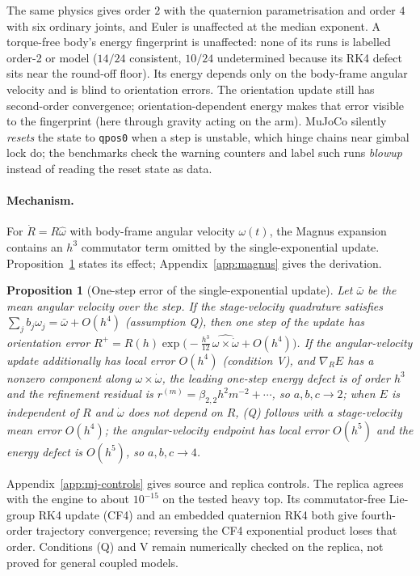 \documentclass[10pt]{article}
\newtheorem{proposition}{Proposition}
\theoremstyle{definition}
\begin{document}
The same physics gives order $2$ with the quaternion parametrisation and order
$4$ with six ordinary joints, and Euler is unaffected at the median exponent.
A torque-free body's energy fingerprint is unaffected: none of its runs is labelled order-2 or model
($14/24$ consistent, $10/24$ undetermined because its RK4 defect sits near the round-off floor). Its energy depends only on the
body-frame angular velocity and is blind to orientation errors. The orientation
update still has second-order convergence; orientation-dependent energy makes
that error visible to the fingerprint (here through gravity acting on the arm). MuJoCo
silently \emph{resets} the state to \texttt{qpos0} when a step is unstable,
which hinge chains near gimbal lock do; the benchmarks check the warning
counters and label such runs \emph{blowup} instead of reading the reset state
as data.

\paragraph{Mechanism.} For $\dot R=R\hat\omega$ with body-frame angular
velocity $\omega(t)$, the Magnus expansion contains an $h^3$ commutator term
omitted by the single-exponential update. Proposition~\ref{prop:magnus}
states its effect; Appendix~\ref{app:magnus} gives the derivation.

\begin{proposition}[One-step error of the single-exponential update]\label{prop:magnus}
Let $\bar\omega$ be the mean angular velocity over the step.
If the stage-velocity quadrature satisfies $\sum_jb_j\omega_j=\bar\omega+O(h^4)$
(assumption Q), then one step of the update has orientation error
$R^+=R(h)\exp\big(-\tfrac{h^3}{12}\,\widehat{\omega\times\dot\omega}+O(h^4)\big)$.
If the angular-velocity update additionally has local error $O(h^4)$
(condition V), and $\nabla_R E$ has a nonzero component along
$\omega\times\dot\omega$, the leading one-step energy defect is of order $h^3$ and the
refinement residual is $r^{(m)}=\beta_{2,2}h^2m^{-2}+\cdots$, so $a,b,c\to2$; when
$E$ is independent of $R$ and $\dot\omega$ does not depend on $R$, (Q) follows with a stage-velocity mean error $O(h^4)$; the angular-velocity
endpoint has local error $O(h^5)$ and the energy defect is $O(h^5)$, so $a,b,c\to4$.
\end{proposition}

Appendix~\ref{app:mj-controls} gives source and replica controls. The replica
agrees with the engine to about $10^{-15}$ on the tested heavy top. Its
commutator-free Lie-group RK4 update (CF4) and an embedded quaternion RK4 both
give fourth-order trajectory convergence; reversing the CF4 exponential
product loses that order. Conditions (Q) and V remain numerically checked on
the replica, not proved for general coupled models.
\end{document}
